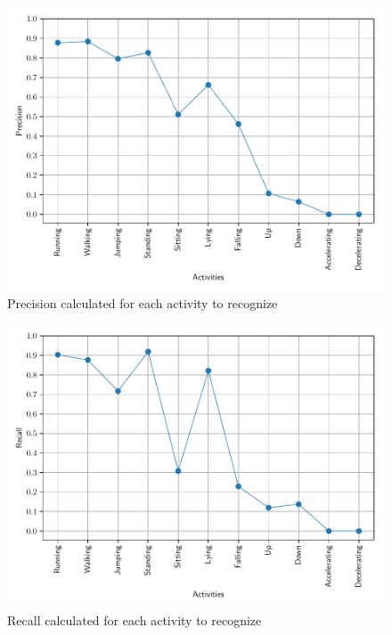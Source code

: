 \begin{figure}
\includegraphics[scale=0.55]{precision.pdf}
\caption{Precision calculated for each activity to recognize}
\label{fig:precision}
\end{figure}

\begin{figure}
\includegraphics[scale=0.55]{recall.pdf}
\caption{Recall calculated for each activity to recognize}
\label{fig:recall}
\end{figure}
